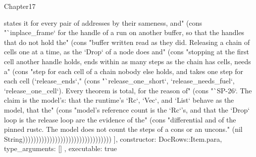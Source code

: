 \begin{lexlean}{Chapter17}
\begin{semanticmodule}
{{states it for every pair of addresses by their sameness, and" (cons "`inplace_frame` for the handle of a run on another buffer, so that the handles that do not hold the" (cons "buffer written read as they did. Releasing a chain of cells one at a time, as the `Drop` of a node does and" (cons "stopping at the first cell another handle holds, ends within as many steps as the chain has cells, needs a" (cons "step for each cell of a chain nobody else holds, and takes one step for each cell (`release_ends`," (cons "`release_one_short`, `release_needs_fuel`, `release_one_cell`). Every theorem is total, for the reason of" (cons "`SP-26`. The claim is the model's: that the runtime's `Rc`, `Vec`, and `List` behave as the model, that the" (cons "model's reference count is the `Rc`'s, and that the `Drop` loop is the release loop are the evidence of the" (cons "differential and of the pinned rustc. The model does not count the steps of a cons or an uncons." (nil String)))))))))))))))))))))))))))))))))
    ],
    constructor: DocRows::Item.para,
    type_arguments: []
  },
  executable: true
}


\end{semanticmodule}
\end{lexlean}
